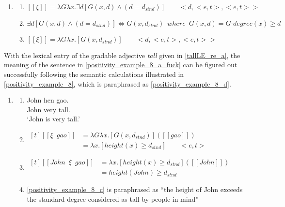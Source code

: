 \documentclass{ctexart}
\begin{document}
\begin{enumerate}
    \item \label{positivity_example_7}
    \begin{enumerate}
        \item \label{positivity_example_7_a}
        $[\![\xi]\!]=\lambda G \lambda x. \exists d [G(x,d) \land (d=d_{stnd})] \qquad <d,<e,t>,<e,t>>$

        \item \label{positivity_example_7_b}
        $\exists d [G(x,d) \land (d=d_{stnd})] \Leftrightarrow G(x,d_{stnd}) \enspace where \enspace G(x,d) = G \mbox{-} degree(x) \geq d$

        \item \label{positivity_example_8_a}
        $[\![\xi]\!]=\lambda G \lambda x. [G(x,d_{stnd})] \qquad <d,<e,t>,<e,t>>$

    \end{enumerate}
\end{enumerate}

With the lexical entry of the gradable adjective \textit{tall} given in \ref{tallLE_re_a}, the meaning of the sentence in \ref{positivity_example_8_a_fuck} can be figured out successfully following the semantic calculations illustrated in \ref{positivity_example_8}, which is paraphrased as \ref{positivity_example_8_d}.

\begin{enumerate}
    \item \label{positivity_example_8}
    \begin{enumerate}

        \item \label{positivity_example_8_a_fuck}
        John hen gao. \\
        John very tall. \\
        `John is very tall.'

        \item \label{positivity_example_8_b}
        $\begin{aligned}[t]
            [\![\xi \enspace gao]\!] &= \lambda G \lambda x. [G(x,d_{stnd})]([\![gao]\!]) \\
            &= \lambda x.[height(x) \geq d_{stnd}] \qquad <e,t>
        \end{aligned}$

        \item \label{positivity_example_8_c}
        $\begin{aligned}[t]
            [\![John \enspace \xi \enspace gao]\!] &= \lambda x.[height(x) \geq d_{stnd}]([\![John]\!]) \\
            &= height(John) \geq d_{stnd}
        \end{aligned}$

        \item \label{positivity_example_8_d}
        \ref{positivity_example_8_c} is paraphrased as ``the height of John exceeds the standard degree considered as tall by people in mind''

    \end{enumerate}
\end{enumerate}
\end{document}
